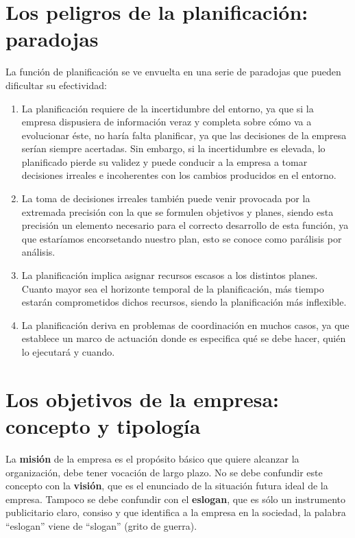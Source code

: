 \documentclass[12pt,a4paper,spanish]{report}
\begin{document}
	\section{\textcolor[rgb]{0.3,0.6,0.4}Los peligros de la planificación: paradojas}
		La función de planificación se ve envuelta en una serie de paradojas que pueden dificultar su efectividad:
		\begin{enumerate}[1.]
			\item La planificación requiere de la incertidumbre del entorno, ya que si la empresa dispusiera de información veraz y completa sobre cómo va a evolucionar éste, no haría falta planificar, ya que las decisiones de la empresa serían siempre acertadas. Sin embargo, si la incertidumbre es elevada, lo planificado pierde su validez y puede conducir a la empresa a tomar decisiones irreales e incoherentes con los cambios producidos en el entorno.

			\item La toma de decisiones irreales también puede venir provocada por la extremada precisión con la que se formulen objetivos y planes, siendo esta precisión un elemento necesario para el correcto desarrollo de esta función, ya que estaríamos encorsetando nuestro plan, esto se conoce como parálisis por análisis.

			\item La planificación implica asignar recursos escasos a los distintos planes. Cuanto mayor sea el horizonte temporal de la planificación, más tiempo estarán comprometidos dichos recursos, siendo la planificación más inflexible.

			\item La planificación deriva en problemas de coordinación en muchos casos, ya que establece un marco de actuación donde es especifica qué se debe hacer, quién lo ejecutará y cuando.
		\end{enumerate}
		
	\section{\textcolor[rgb]{0.3,0.6,0.4}Los objetivos de la empresa: concepto y tipología}
		La \textbf{misión} de la empresa es el propósito básico que quiere alcanzar la organización, debe tener vocación de largo plazo. No se debe confundir este concepto con la \textbf{visión}, que es el enunciado de la situación futura ideal de la empresa. Tampoco se debe confundir con el \textbf{eslogan}, que es sólo un instrumento publicitario claro, consiso y que identifica a la empresa en la sociedad, la palabra ``eslogan'' viene de ``slogan'' (grito de guerra).
\end{document}
